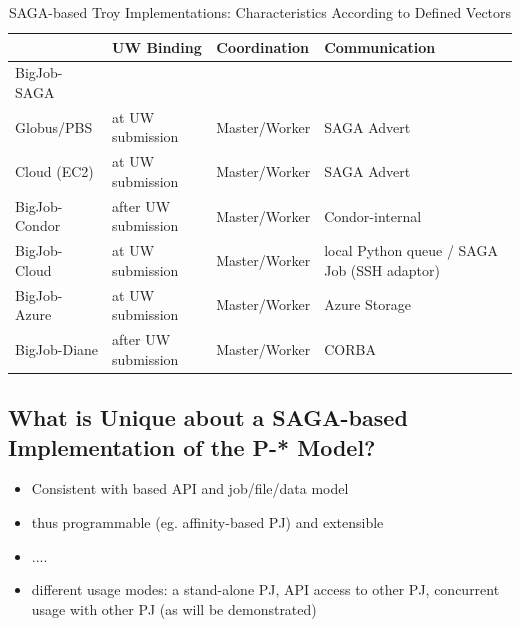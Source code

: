 \documentclass[conference,final]{IEEEtran}
\begin{document}
\begin{table}[t]
\centering
\begin{tabular}{|p{1.8cm}|p{1.7cm}|p{1.7cm}|p{1.7cm}|}
	\hline
	&\textbf{UW Binding} &\textbf{Coordina\-tion} & \textbf{Communica\-tion} \\
	\hline
	BigJob-SAGA &&&\\
	\hline
	\hspace{2mm} Globus/PBS   &at UW submission
									  &Master/Worker &SAGA Advert \\  
	\hline
	\hspace{2mm} Cloud (EC2)  &at UW submission 
									  &Master/Worker &SAGA Advert \\ 
    \hline
   BigJob-Condor &after UW submission &Master/Worker &Condor-internal \\
	\hline
 	BigJob-Cloud &at UW submission   &Master/Worker 
				 &local Python queue / SAGA Job (SSH adaptor) \\ 
	\hline
	BigJob-Azure &at UW submission
	             &Master/Worker &Azure Storage \\ 
	\hline
    BigJob-Diane &after UW submission  &Master/Worker &CORBA  \\ 
	\hline	
\end{tabular}
\caption{SAGA-based Troy Implementations: Characteristics According to
  Defined Vectors} \label{tab:pilotjob_overview}
\end{table}		


\subsection{What is Unique about a SAGA-based Implementation of the
  P-* Model?}

\begin{itemize}
\item Consistent with based API and job/file/data model
\item thus programmable (eg. affinity-based PJ) and extensible 
\item ....
\item different usage modes: a stand-alone PJ, API access to other PJ,
  concurrent usage with other PJ (as will be demonstrated)
\end{itemize}
\end{document}
